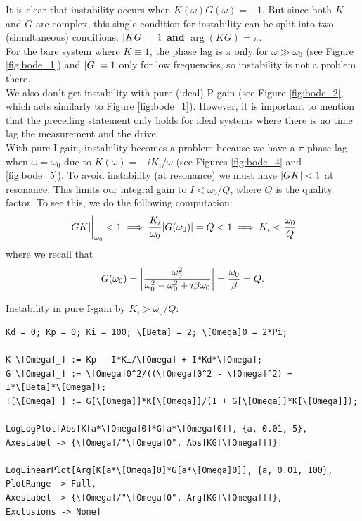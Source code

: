 \documentclass{article}
\theoremstyle{definition}
\newcommand{\f}[2]{\frac{#1}{#2}}
\begin{document}
It is clear that instability occurs when $K(\omega)G(\omega) = -1$. But since both $K$ and $G$ are complex, this single condition for instability can be split into two (simultaneous) conditions: $\abs{KG} = 1$ \textbf{and} $\arg(KG) = \pi$. \\


\noindent For the bare system where $K\equiv 1$, the phase lag is $\pi$ only for $\omega \gg \omega_0$ (see Figure \ref{fig:bode_1}) and $\abs{G} = 1$ only for low frequencies,  so instability is not a problem there. \\


\noindent We also don't get instability with pure (ideal) P-gain (see Figure \ref{fig:bode_2}, which acts similarly to Figure \ref{fig:bode_1}). However, it is important to mention that the preceding statement only holds for ideal systems where there is no time lag the measurement and the drive. \\


\noindent With pure I-gain, instability becomes a problem because we have a $\pi$ phase lag when $\omega = \omega_0$ due to $K(\omega) = -iK_i/\omega$ (see Figures \ref{fig:bode_4} and \ref{fig:bode_5}). To avoid instability (at resonance) we must have $\abs{GK} < 1$ at resonance. This limits our integral gain to $I < \omega_0/Q$, where $Q$ is the quality factor. To see this, we do the following computation:
\begin{equation*}
\abs{GK}\bigg\vert_{\omega_0} < 1 \implies \f{K_i}{\omega_0} \abs{G(\omega_0)} = Q < 1 \implies  K_i < \f{\omega_0}{Q}
\end{equation*}
where we recall that 
\begin{equation*}
G(\omega_0) = \abs{\f{\omega_0^2}{\omega_0^2 - \omega_0^2 + i\beta \omega_0}} = \f{\omega_0}{\beta} = Q.
\end{equation*}


\noindent Instability in pure I-gain by $K_i > \omega_0/Q$:
\begin{lstlisting}
Kd = 0; Kp = 0; Ki = 100; \[Beta] = 2; \[Omega]0 = 2*Pi;

K[\[Omega]_] := Kp - I*Ki/\[Omega] + I*Kd*\[Omega]; 
G[\[Omega]_] := \[Omega]0^2/((\[Omega]0^2 - \[Omega]^2) + 
I*\[Beta]*\[Omega]); 
T[\[Omega]_] := G[\[Omega]]*K[\[Omega]]/(1 + G[\[Omega]]*K[\[Omega]]);

LogLogPlot[Abs[K[a*\[Omega]0]*G[a*\[Omega]0]], {a, 0.01, 5}, 
AxesLabel -> {\[Omega]/"\[Omega]0", Abs[KG[\[Omega]]]}]

LogLinearPlot[Arg[K[a*\[Omega]0]*G[a*\[Omega]0]], {a, 0.01, 100}, 
PlotRange -> Full, 
AxesLabel -> {\[Omega]/"\[Omega]0", Arg[KG[\[Omega]]]}, 
Exclusions -> None]
\end{lstlisting}
\end{document}
